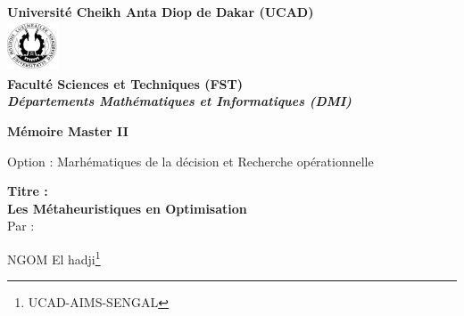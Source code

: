 \documentclass[a4paper,11pt,oneside]{report}
\theoremstyle{plain}
\newcommand{\0}{/ \! \! \! 0}
\theoremstyle{plain}
\begin{document}
\dominitoc

\begin{titlepage}
\begin{center}
{\bf Universit\'e Cheikh Anta Diop de Dakar (UCAD)} \\\vspace{2cm}
\includegraphics[height=1.5cm,width=1.5cm]{logo.pdf}\\

\vspace{0.2cm}
{\bf Facult\'e Sciences et Techniques (FST)}\\
\vspace{0.2cm}
{{\bf\it D\'epartements Math\'ematiques et Informatiques (DMI)\\}}
\end{center}


\vspace{1.2cm}

\begin{center}

{\bf M\'emoire Master II \\
\vskip 0.2cm 

Option : Marh\'ematiques de la d\'ecision et Recherche op\'erationnelle\\}

\vspace{1.5cm}
{\bf Titre :\\}
{\Large\bf Les M\'etaheuristiques en Optimisation\\ }
\vspace{0.5cm}
Par :

\vspace{1cm}

NGOM El hadji\footnote{UCAD-AIMS-SENGAL}\\

\vspace{1cm}


\end{center}
\end{titlepage}
\end{document}
